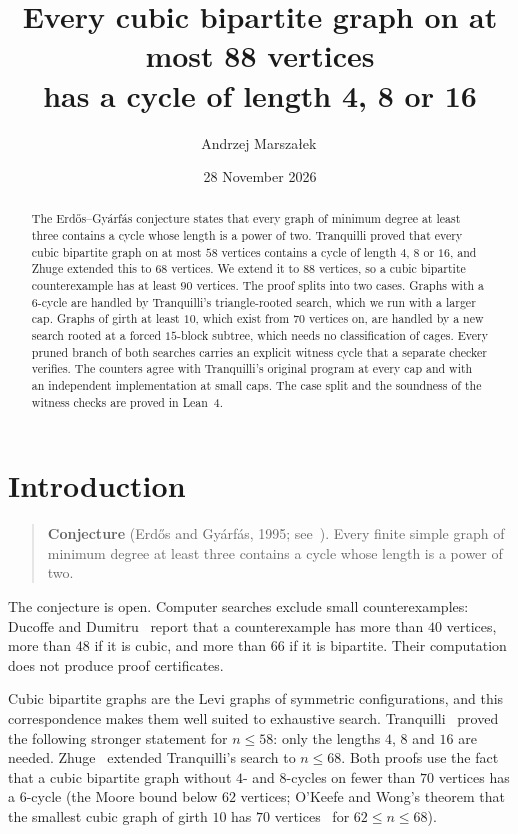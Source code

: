 \documentclass[11pt]{amsart}
\title[Cubic bipartite graphs without cycles of length 4, 8, 16]{Every cubic bipartite graph on at most 88 vertices\\ has a cycle of length 4, 8 or 16}
\author[A. Marszałek]{Andrzej Marszałek\,\orcidlink{0009-0006-6148-2965}}
\date{28 November 2026}
\theoremstyle{definition}
\theoremstyle{remark}
\begin{document}
\begin{abstract}
The Erdős–Gyárfás conjecture states that every graph of minimum degree at least
three contains a cycle whose length is a power of two. Tranquilli proved that
every cubic bipartite graph on at most $58$ vertices contains a cycle of length
$4$, $8$ or $16$, and Zhuge extended this to $68$ vertices. We extend it to $88$
vertices, so a cubic bipartite counterexample has at least $90$ vertices. The
proof splits into two cases. Graphs with a $6$-cycle are handled by
Tranquilli's triangle-rooted search, which we run with a larger cap. Graphs of
girth at least $10$, which exist from $70$ vertices on, are handled by a new
search rooted at a forced $15$-block subtree, which needs no classification of
cages. Every pruned branch of both searches carries an explicit witness
cycle that a separate checker verifies. The counters agree with Tranquilli's
original program at every cap and with an independent implementation at small
caps. The case split and the soundness of the witness checks are proved in
Lean~4.
\end{abstract}

\maketitle

\section{Introduction}

\begin{quote}
\textbf{Conjecture} (Erdős and Gyárfás, 1995; see~\cite{Erdos1997}).
Every finite simple graph of minimum degree at least three contains a cycle
whose length is a power of two.
\end{quote}

The conjecture is open. Computer searches exclude small counterexamples:
Ducoffe and Dumitru~\cite{DucoffeDumitru2026} report that a counterexample has
more than $40$ vertices, more than $48$ if it is cubic, and more than $66$ if it
is bipartite. Their computation does not produce proof certificates.

Cubic bipartite graphs are the Levi graphs of symmetric configurations, and
this correspondence makes them well suited to exhaustive search. Tranquilli~\cite{Tranquilli2026}
proved the following stronger statement for $n\le 58$: only the lengths $4$, $8$
and $16$ are needed. Zhuge~\cite{Zhuge2026} extended Tranquilli's search to
$n\le 68$. Both proofs use the fact that a cubic bipartite graph without
$4$- and $8$-cycles on fewer than $70$ vertices has a $6$-cycle (the Moore bound
below $62$ vertices; O'Keefe and Wong's theorem that the smallest cubic graph of
girth $10$ has $70$ vertices~\cite{OKeefeWong1980} for $62\le n\le 68$).
\end{document}
